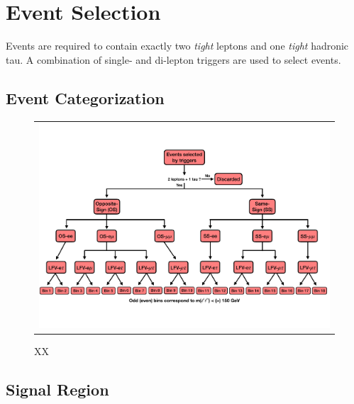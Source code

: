 \chapter{Event Selection}
\label{chap:Evt}

Events are required to contain exactly two \emph{tight} leptons and one \emph{tight} hadronic tau. A combination of single- and di-lepton triggers are used to select events.
\section{Event Categorization}
\label{sec:Cat}

\begin{figure}[tbh!]
 \begin{center}
 \begin{tabular}{c}
 \includegraphics[width=\textwidth]{figures/Part4/Evt/SRFlowChart}
 \end{tabular}
 \caption{XX}
 \label{fig:EvtCat}
 \end{center}
 \end{figure}

\section{Signal Region}
\label{sec:SRInclusive}


